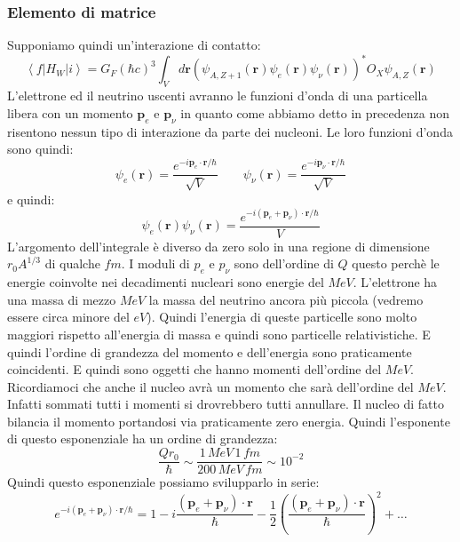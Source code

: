 \subsubsection{Elemento di matrice}
Supponiamo quindi un'interazione di contatto:
\begin{equation*}
   \left\langle f\left|H_W\right| i\right\rangle =G_F(\hbar c)^3 \int_V d \mathbf{r}\left(\psi_{A, Z+1}(\mathbf{r}) \psi_e(\mathbf{r}) \psi_\nu(\mathbf{r})\right)^* O_X \psi_{A, Z}(\mathbf{r})
\end{equation*}
L'elettrone ed il neutrino uscenti avranno le funzioni d'onda di una particella libera con un momento $\mathbf{p}_e$ e $\mathbf{p}_\nu$ in quanto come abbiamo detto in precedenza non risentono nessun tipo di interazione da parte dei nucleoni. Le loro funzioni d'onda sono quindi:
\begin{equation*}
    \psi_e(\mathbf{r})=\frac{e^{-i\mathbf{p}_e\cdot\mathbf{r}/\hbar}}{\sqrt{V}}\qquad \psi_\nu(\mathbf{r})=\frac{e^{-i\mathbf{p}_\nu\cdot\mathbf{r}/\hbar}}{\sqrt{V}}
\end{equation*}
e quindi:
\begin{equation*}
    \psi_e(\mathbf{r})\psi_\nu(\mathbf{r})=\frac{e^{-i(\mathbf{p}_e+\mathbf{p}_\nu)\cdot\mathbf{r}/\hbar}}{V}
\end{equation*}
L'argomento dell'integrale è diverso da zero solo in una regione di dimensione $r_0A^{1/3}$ di qualche $fm$. I moduli di $p_e$ e $p_\nu$ sono dell'ordine di $Q$ questo perchè le energie coinvolte nei decadimenti nucleari sono energie del $MeV$. L'elettrone ha una massa di mezzo $MeV$ la massa del neutrino ancora più piccola (vedremo essere circa minore del $eV$). Quindi l'energia di queste particelle sono molto maggiori rispetto all'energia di massa e quindi sono particelle relativistiche. E quindi l'ordine di grandezza del momento e dell'energia sono praticamente coincidenti. E quindi sono oggetti che hanno momenti dell'ordine del $MeV$. Ricordiamoci che anche il nucleo avrà un momento che sarà dell'ordine del $MeV$. Infatti sommati tutti i momenti si drovrebbero tutti annullare. Il nucleo di fatto bilancia il momento portandosi via praticamente zero energia. Quindi l'esponente di questo esponenziale ha un ordine di grandezza:
\begin{equation*}
    \frac{Qr_0}{\hbar}\sim\frac{1\,MeV\,1\,fm}{200\,MeV\,fm}\sim 10^{-2}
\end{equation*}
Quindi questo esponenziale possiamo svilupparlo in serie:
\begin{equation*}
    e^{-i\left(\mathbf{p}_e+\mathbf{p}_\nu\right) \cdot \mathbf{r} / \hbar}=1-i \frac{\left(\mathbf{p}_e+\mathbf{p}_\nu\right) \cdot \mathbf{r}}{\hbar}-\frac{1}{2}\left(\frac{\left(\mathbf{p}_e+\mathbf{p}_\nu\right) \cdot \mathbf{r}}{\hbar}\right)^2+\ldots
\end{equation*}
